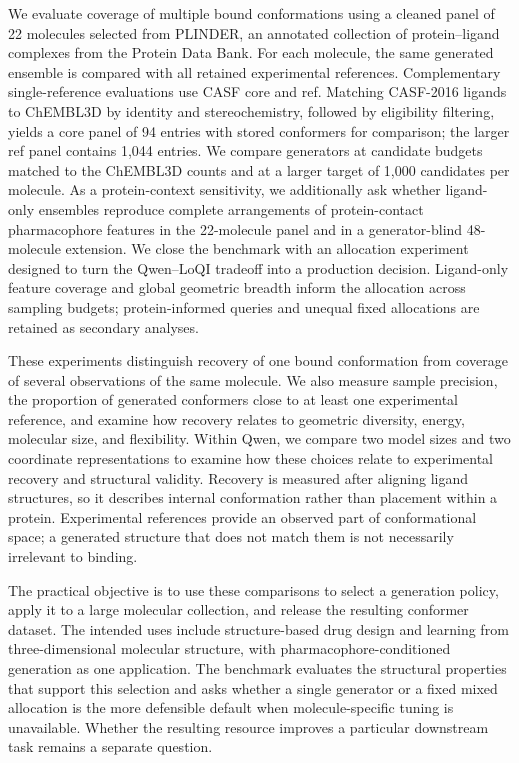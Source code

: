 We evaluate coverage of multiple bound conformations using a cleaned panel of 22 molecules
selected from PLINDER,\cite{durairaj2024plinder} an annotated collection of protein--ligand complexes from the Protein
Data Bank. For each molecule, the same generated ensemble is compared with all retained
experimental references. Complementary single-reference evaluations use CASF\cite{su2019casf} core and ref.
Matching CASF-2016 ligands to ChEMBL3D by identity and stereochemistry, followed by eligibility
filtering, yields a core panel of 94 entries with stored conformers for comparison; the larger
ref panel contains 1,044 entries. We compare generators at candidate budgets matched to the
ChEMBL3D counts and at a larger target of 1,000 candidates per molecule. As a
protein-context sensitivity, we additionally ask whether ligand-only ensembles
reproduce complete arrangements of protein-contact pharmacophore features in the
22-molecule panel and in a generator-blind 48-molecule extension. We close the
benchmark with an allocation experiment designed to turn the Qwen--LoQI tradeoff
into a production decision. Ligand-only feature coverage and global geometric
breadth inform the allocation across sampling budgets; protein-informed queries and
unequal fixed allocations are retained as secondary analyses.

These experiments distinguish recovery of one bound conformation from coverage of several
observations of the same molecule. We also measure sample precision, the proportion of generated
conformers close to at least one experimental reference, and examine how recovery relates to
geometric diversity, energy, molecular size, and flexibility. Within Qwen, we compare two model
sizes and two coordinate representations to examine how these choices relate to experimental
recovery and structural validity. Recovery is measured after aligning
ligand structures, so it describes internal conformation rather than placement within a protein.
Experimental references provide an observed part of conformational space; a generated structure that
does not match them is not necessarily irrelevant to binding.

The practical objective is to use these comparisons to select a generation policy, apply it to a large
molecular collection, and release the resulting conformer dataset. The intended uses include
structure-based drug design and learning from three-dimensional molecular structure, with
pharmacophore-conditioned generation as one application. The benchmark evaluates the structural
properties that support this selection and asks whether a single generator or a fixed mixed
allocation is the more defensible default when molecule-specific tuning is unavailable. Whether
the resulting resource improves a particular downstream task remains a separate question.
